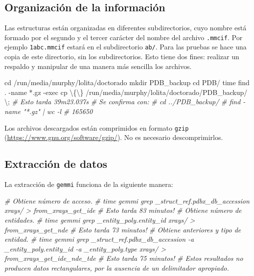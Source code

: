 \documentclass[
]{book}
\newenvironment{Shaded}{\begin{snugshade}}{\end{snugshade}}
\newcommand{\BuiltInTok}[1]{#1}
\newcommand{\CommentTok}[1]{\textcolor[rgb]{0.56,0.35,0.01}{\textit{#1}}}
\newcommand{\DataTypeTok}[1]{\textcolor[rgb]{0.13,0.29,0.53}{#1}}
\newcommand{\FunctionTok}[1]{\textcolor[rgb]{0.00,0.00,0.00}{#1}}
\newcommand{\NormalTok}[1]{#1}
\newcommand{\StringTok}[1]{\textcolor[rgb]{0.31,0.60,0.02}{#1}}
\begin{document}
\hypertarget{organizaciuxf3n-de-la-informaciuxf3n}{%
\subsection{Organización de la información}\label{organizaciuxf3n-de-la-informaciuxf3n}}

Las estructuras están organizadas en diferentes subdirectorios, cuyo nombre está formado por el segundo y el tercer carácter del nombre del archivo \texttt{.mmcif}. Por ejemplo \texttt{1abc.mmcif} estará en el subdirectorio \texttt{ab/}. Para las pruebas se hace una copia de este directorio, sin los subdirectorios. Esto tiene dos fines: realizar un respaldo y manipular de una manera más sencilla los archivos.

\begin{Shaded}
\begin{Highlighting}[]
\BuiltInTok{cd}\NormalTok{ /run/media/murphy/lolita/doctorado}
\FunctionTok{mkdir}\NormalTok{ PDB\_backup}
\BuiltInTok{cd}\NormalTok{ PDB/}
\BuiltInTok{time}\NormalTok{ find . {-}name }\StringTok{\textquotesingle{}*.gz\textquotesingle{}}\NormalTok{ {-}exec cp }\DataTypeTok{\textbackslash{}\{\textbackslash{}\}}\NormalTok{ /run/media/murphy/lolita/doctorado/PDB\_backup/ }\DataTypeTok{\textbackslash{};} 
\CommentTok{\# Esto tarda 39m23.037s}
\CommentTok{\# Se confirma con:}
\CommentTok{\# cd ../PDB\_backup/}
\CommentTok{\# find {-}name "*.gz" | wc {-}l}
\CommentTok{\# 165650}
\end{Highlighting}
\end{Shaded}

Los archivos descargados están comprimidos en formato \texttt{gzip} (\url{https://www.gnu.org/software/gzip/}). No es necesario descomprimirlos.

\hypertarget{extracciuxf3n-de-datos-1}{%
\subsection{Extracción de datos}\label{extracciuxf3n-de-datos-1}}

La extracción de \texttt{gemmi} funciona de la siguiente manera:

\begin{Shaded}
\begin{Highlighting}[]
\CommentTok{\# Obtiene número de acceso.}
\CommentTok{\# time gemmi grep \_struct\_ref.pdbx\_db\_accession xrays/ \textgreater{} from\_xrays\_get\_ide}
\CommentTok{\# Esto tarda 83 minutos!}
\CommentTok{\# Obtiene número de entidades.}
\CommentTok{\# time gemmi grep \_entity\_poly.entity\_id xrays/ \textgreater{} from\_xrays\_get\_nde}
\CommentTok{\# Esto tarda 73 minutos!}
\CommentTok{\# Obtiene anteriores y tipo de entidad.}
\CommentTok{\# time gemmi grep \_struct\_ref.pdbx\_db\_accession {-}a \_entity\_poly.entity\_id {-}a \_entity\_poly.type xrays/ \textgreater{} from\_xrays\_get\_ide\_nde\_tde }
\CommentTok{\# Esto tarda 75 minutos!}
\CommentTok{\# Estos resultados no producen datos rectangulares, por la ausencia de un delimitador apropiado.}
\end{Highlighting}
\end{Shaded}
\end{document}
